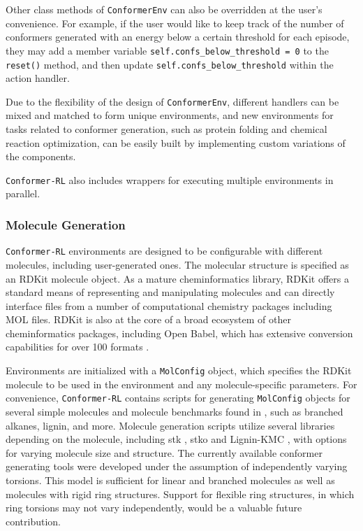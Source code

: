 \documentclass[twoside,11pt]{article}
\newcommand{\code}[1]{\texttt{#1}}
\newcommand{\titleofpaper}{Conformer-RL}
\begin{document}
Other class methods of \code{ConformerEnv} can also be overridden at the user's convenience. For example, if the user would like to keep track of the number of conformers generated with an energy below a certain threshold for each episode, they may add a member variable \code{self.confs\_below\_threshold = 0} to the \code{reset()} method, and then update \code{self.confs\_below\_threshold} within the action handler.

Due to the flexibility of the design of \code{ConformerEnv}, different handlers can be mixed and matched to form unique environments, and new environments for tasks related to conformer generation, such as protein folding and chemical reaction optimization, can be easily built by implementing custom variations of the components.

\code{\titleofpaper} also includes wrappers for executing multiple environments in parallel. 

  \subsubsection{Molecule Generation}
  \code{\titleofpaper} environments are designed to be configurable with different molecules, including user-generated ones. The molecular structure is specified as an RDKit molecule object. As a mature cheminformatics library, RDKit offers a standard means of representing and manipulating molecules and can directly interface files from a number of computational chemistry packages including MOL files. RDKit is also at the core of a broad ecosystem of other cheminformatics packages, including Open Babel, which has extensive conversion capabilities for over 100 formats \citep{Oboyle2011openbabel}. 
  
  Environments are initialized with a \code{MolConfig} object, which specifies the RDKit molecule to be used in the environment and any molecule-specific parameters. For convenience, \code{\titleofpaper} contains scripts for generating \code{MolConfig} objects for several simple molecules and molecule benchmarks found in \citet{gogineni2020torsionnet}, such as branched alkanes, lignin, and more. Molecule generation scripts utilize several libraries depending on the molecule, including stk \citep{Turcani2021stk}, stko \citep{Tarzia2021stko} and Lignin-KMC \citep{Orella2019ligninkmc}, with options for varying molecule size and structure. The currently available conformer generating tools were developed under the assumption of independently varying torsions. This model is sufficient for linear and branched molecules as well as molecules with rigid ring structures. Support for flexible ring structures, in which ring torsions may not vary independently, would be a valuable future contribution.
  
\end{document}
